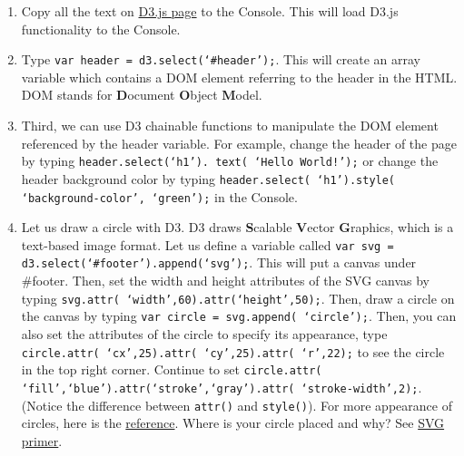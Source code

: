 \documentclass[a4paper, 11pt]{article}
\begin{document}
\begin{enumerate}
\item Copy all the text on \href{https://raw.githubusercontent.com/mbostock/d3/master/d3.min.js}{D3.js page} to the Console. This will load D3.js functionality to the Console. 
\item Type \texttt{\color{red}var header = d3.select(`\#{header}');}. This will create an array variable which contains a DOM element referring to the header in the HTML. DOM stands for {\bf D}ocument {\bf O}bject {\bf M}odel.
\item Third, we can use D3 chainable functions to manipulate the DOM element referenced by the header variable. For example, change the header of the page by typing \texttt{\color{red}header.select(`h1'). text( `Hello World!');} or change the header background color by typing \texttt{\color{red}header.select( `h1').style( `background-color', `green');} in the Console.
\item Let us draw a circle with D3. D3 draws {\bf S}calable {\bf V}ector {\bf G}raphics, which is a text-based image format. Let us define a variable called \texttt{\color{red}var svg = d3.select(`\#{footer}').append(`svg');}. This will put a canvas under \#{footer. }Then, set the width and height attributes of the SVG canvas by typing {\color{red}\tt svg.attr( `width',60).attr(`height',50);}. Then, draw a circle on the canvas by typing \texttt{\color{red}var circle = svg.append( `circle');}. Then, you can also set the attributes of the circle to specify its appearance, type \texttt{\color{red}circle.attr( `cx',25).attr( `cy',25).attr( `r',22);} to see the circle in the top right corner. Continue to set \texttt{\color{red}circle.attr( `fill',`blue').attr(`stroke',`gray').attr( `stroke-width',2);}. (Notice the difference between \texttt{attr()} and \texttt{style()}). For more appearance of circles, here is the \href{http://alignedleft.com/tutorials/d3/an-svg-primer}{reference}. Where is your circle placed and why? See \href{http://alignedleft.com/tutorials/d3/an-svg-primer}{SVG primer}.


\end{enumerate}
\end{document}

